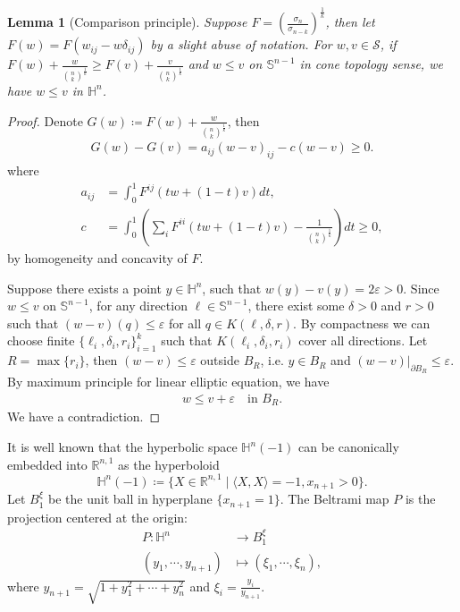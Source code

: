 \documentclass[reqno]{amsart}
\newtheorem{lemma}[theorem]{Lemma}
\theoremstyle{remark}
\theoremstyle{definition}
\numberwithin{equation}{section}
\begin{document}
\begin{lemma}[Comparison principle]\label{Comparison principle}
    Suppose $F=\left( \frac{\sigma_n}{\sigma_{n-k}} \right)^{\frac{1}{k}}$, then let $F(w)=F(w_{ij}-w\delta_{ij})$ by a slight abuse of notation. For $w,v \in \mathcal{S}$, if $F(w) + \frac{w}{\binom{n}{k}^{\frac{1}{k}}} \geqslant F(v) + \frac{v}{\binom{n}{k}^{\frac{1}{k}}}$ and $w \leqslant v$ on $\mathbb{S}^{n-1}$ in cone topology sense, we have $w \leqslant v$ in $\mathbb{H}^{n}$. 
\end{lemma}
\begin{proof}
    Denote $G(w) \coloneqq F(w) + \frac{w}{\binom{n}{k}^{\frac{1}{k}}}$, then 
    \begin{align*}
        G(w) - G(v)= a_{ij}(w-v)_{ij} - c (w-v) \geqslant 0.
    \end{align*}
    where 
    \begin{align*}
        a_{ij} &= \int_{0}^{1} F^{ij}\left( tw + (1-t)v \right) dt, \\
        c &= \int_{0}^{1} \left( \sum_{i}F^{ii}\left( tw + (1-t)v \right) - \frac{1}{\binom{n}{k}^{\frac{1}{k}}} \right) dt \geqslant 0,
    \end{align*}
    by homogeneity and concavity of $F$.

    Suppose there exists a point $y \in \mathbb{H}^n$, such that $w(y) - v(y) = 2\varepsilon > 0$. Since $w \leqslant v$ on $\mathbb{S}^{n-1}$, for any direction $\ell \in \mathbb{S}^{n-1}$, there exist some $\delta > 0$ and $r > 0$ such that $(w-v)(q) \leqslant \varepsilon$ for all $q \in K(\ell, \delta, r)$. By compactness we can choose finite $\{\ell_i, \delta_i,r_i\}_{i=1}^k$ such that $K(\ell_i, \delta_i, r_i)$ cover all directions. Let $R = \max\{r_i\}$, then $(w-v) \leqslant \varepsilon$ outside $B_R$, i.e. $y \in B_R$ and $\left.(w-v)\right|_{\partial B_R} \leqslant \varepsilon$.
    By maximum principle for linear elliptic equation, we have
    \begin{align*}
        w \leqslant v + \varepsilon \quad \text{in } B_R.
    \end{align*}
    We have a contradiction. 
\end{proof}

It is well known that the hyperbolic space $\mathbb{H}^n(-1)$ can be  canonically embedded into $\mathbb{R}^{n,1}$ as the hyperboloid
\[
\mathbb{H}^n(-1) \coloneqq \{X \in \mathbb{R}^{n,1} \mid \langle X, X \rangle = -1, x_{n+1}>0 \}.
\]
Let $B_1^{\xi}$ be the unit ball in hyperplane $\{x_{n+1}=1\}$. The Beltrami map $P$ is the projection centered at the origin: 
\begin{align*}
    P: \mathbb{H}^n &\longrightarrow B_1^{\xi} \\
    (y_1, \cdots, y_{n+1}) &\longmapsto (\xi_1, \cdots, \xi_n),
\end{align*}
where $y_{n+1} = \sqrt{1+y_1^2+\cdots+y_n^2}$ and $\xi_i = \frac{y_i}{y_{n+1}}$.
\end{document}
